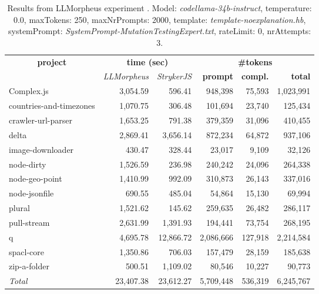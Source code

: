 
\begin{table*}[hbt!]
\centering
{\scriptsize
\begin{tabular}{l||r|r|r|r|r}
\multicolumn{1}{c|}{\bf project} & \multicolumn{2}{|c|}{\bf time (sec)} & \multicolumn{3}{|c|}{\bf \#tokens} \\
               & {\it LLMorpheus} & {\it StrykerJS} & {\bf prompt} & {\bf compl.} & {\bf total} \\
\hline
  Complex.js & 3,054.59 & 596.41 & 948,398 & 75,593 & 1,023,991 \\ 
countries-and-timezones & 1,070.75 & 306.48 & 101,694 & 23,740 & 125,434 \\ 
crawler-url-parser & 1,653.25 & 791.38 & 379,359 & 31,096 & 410,455 \\ 
delta & 2,869.41 & 3,656.14 & 872,234 & 64,872 & 937,106 \\ 
image-downloader & 430.47 & 328.44 & 23,017 & 9,109 & 32,126 \\ 
node-dirty & 1,526.59 & 236.98 & 240,242 & 24,096 & 264,338 \\ 
node-geo-point & 1,410.99 & 992.09 & 310,873 & 26,143 & 337,016 \\ 
node-jsonfile & 690.55 & 485.04 & 54,864 & 15,130 & 69,994 \\ 
plural & 1,521.62 & 145.62 & 259,635 & 26,482 & 286,117 \\ 
pull-stream & 2,631.99 & 1,391.93 & 194,441 & 73,754 & 268,195 \\ 
q & 4,695.78 & 12,866.72 & 2,086,666 & 127,918 & 2,214,584 \\ 
spacl-core & 1,350.86 & 706.03 & 157,479 & 28,159 & 185,638 \\ 
zip-a-folder & 500.51 & 1,109.02 & 80,546 & 10,227 & 90,773 \\ 
\hline
  \textit{Total} & 23,407.38 & 23,612.27 & 5,709,448 & 536,319 & 6,245,767 \\
  \end{tabular}
  }
  \\[2mm]
  \caption{Results from LLMorpheus experiment .
    Model: \textit{codellama-34b-instruct}, 
    temperature: 0.0, 
    maxTokens: 250, 
    maxNrPrompts: 2000, 
    template: \textit{template-noexplanation.hb}, 
    systemPrompt: \textit{SystemPrompt-MutationTestingExpert.txt}, 
    rateLimit: 0, 
    nrAttempts: 3.  
  }
  \label{table:Cost:run375:codellama-34b-instruct:template-noexplanation.hb:0.0}
\end{table*}